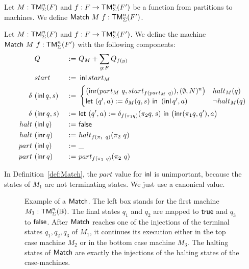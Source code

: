 Let $M : \mathsf{TM}_\Sigma^n(F)$ and $f : F \rightarrow \mathsf{TM}_\Sigma^n(F')$ be a function from partitions to machines.  We define
$\mathsf{Match}~M~f : \mathsf{TM}_\Sigma^n(F')$.

\begin{definition}[$\MS{Match}~M~f$][Match]
  \label{def:Match}
  Let $M : \mathsf{TM}_\Sigma^n(F)$ and $f : F \rightarrow \mathsf{TM}_\Sigma^n(F')$.  We define the machine $\mathsf{Match}~M~f : \mathsf{TM}_\Sigma^n(F')$ with the following
  components:
  \begin{alignat*}{3}
    & Q                  &~:=~& Q_M +  \sum_{y:F} Q_{f(y)} \\
    & start              &~:=~& \operatorname{\mathsf{inl}} start_M \\
    \delta ~&(\operatorname{\mathsf{inl}} q, s) &~:=~&
    \begin{cases}
      \bigl(\operatorname{\mathsf{inr}} (part_M~q, start_{f (part_M~q)}), (\emptyset, N)^n \bigr) & halt_M(q) \\
      \mathsf{let}~(q', a) := \delta_M(q, s)~\mathsf{in}~\left(\operatorname{\mathsf{inl}} q', a \right) & \lnot halt_M(q)
    \end{cases} \\
    \delta ~&(\operatorname{\mathsf{inr}} q, s) &~:=~& \mathsf{let}~(q', a) := \delta_{f(\pi_1 q)} (\pi_2 q, s)~\mathsf{in}~\bigl( \operatorname{\mathsf{inr}} (\pi_1 q, q'), a \bigr) \\
    halt   ~&(\operatorname{\mathsf{inl}}  q)   &~:=~& \mathsf{false} \\
    halt   ~&(\operatorname{\mathsf{inr}}  q)   &~:=~& halt_{f(\pi_1~q)} (\pi_2~q) \\
    part   ~&(\operatorname{\mathsf{inl}}  q)   &~:=~& \_ \\
    part   ~&(\operatorname{\mathsf{inr}}  q)   &~:=~& part_{f(\pi_1~q)} (\pi_2~q)
  \end{alignat*}
\end{definition}

In Definition~\ref{def:Match}, the $part$ value for $\operatorname{\mathsf{inl}}$ is unimportant, because the states of $M_1$ are not terminating states.  We just use a
canonical value.

\begin{figure}
  \center
  
  \caption{Example of a $\mathsf{Match}$.  The left box stands for the first machine $M_1:\mathsf{TM}_\Sigma^n(\mathbb{B})$.  The final states $q_1$ and $q_2$ are
    mapped to $\mathsf{true}$ and $q_3$ to $\mathsf{false}$.  After $\mathsf{Match}$ reaches one of the injections of the terminal states $q_1, q_2, q_3$ of $M_1$, it
    continues its execution either in the top case machine $M_2$ or in the bottom case machine $M_3$.  The halting states of $\mathsf{Match}$ are exactly
    the injections of the halting states of the case-machines.}
  \label{fig:match}
\end{figure}

